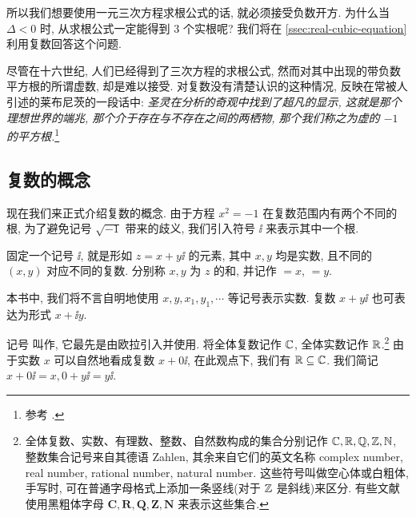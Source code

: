 所以我们想要使用一元三次方程求根公式的话, 就\alert{必须接受负数开方}.
为什么当 $\Delta<0$ 时, 从求根公式一定能得到 $3$ 个实根呢?
我们将在 \ref{ssec:real-cubic-equation}利用复数回答这个问题.

尽管在十六世纪, 人们已经得到了三次方程的求根公式, 然而对其中出现的带负数平方根的所谓虚数, 却是难以接受.
对复数没有清楚认识的这种情况, 反映在常被人引述的莱布尼茨的一段话中: \textcolor{third}{\itshape 圣灵在分析的奇观中找到了超凡的显示, 这就是那个理想世界的端兆, 那个介于存在与不存在之间的两栖物, 那个我们称之为虚的 $-1$ 的平方根.}\footnote{%
  参考 \cite[第13章2节]{Kline1990}.
}


\subsection{复数的概念}

现在我们来正式介绍复数的概念.
由于方程 $x^2=-1$ 在复数范围内有两个不同的根, 为了避免记号 $\sqrt{-1}$ 带来的歧义, 我们引入符号 $\ii$ 来表示其中一个根.

\begin{definition}
  固定一个记号 $\ii$, 就是形如 $z=x+y\ii$ 的元素, 其中 $x,y$ 均是实数, 且不同的 $(x,y)$ 对应不同的复数.
  分别称 $x,y$ 为 $z$ 的和, 并记作 ${}=x$, ${}=y$.
\end{definition}

本书中, 我们将不言自明地使用 $x,y,x_1,y_1,\cdots$ 等记号表示实数.
复数 $x+y\ii$ 也可表达为形式 $x+\ii y$.

记号 \noun{$\ii$} 叫作, 它最先是由欧拉引入并使用.
将\alert{全体复数记作 ${\mathbb{C}}$}, 全体实数记作 ${\mathbb{R}}$.\footnote{%
  全体复数、实数、有理数、整数、自然数构成的集合分别记作 ${\mathbb{C}},{\mathbb{R}},{\mathbb{Q}},{\mathbb{Z}},{\mathbb{N}}$, 整数集合记号来自其德语 Zahlen, 其余来自它们的英文名称 complex number, real number, rational number, natural number.
  这些符号叫做空心体或白粗体, 手写时, 可在普通字母格式上添加一条竖线(对于 ${\mathbb{Z}}$ 是斜线)来区分.
  有些文献使用黑粗体字母 $\mathbf{C,R,Q,Z,N}$ 来表示这些集合.
}
由于实数 $x$ 可以自然地看成复数 $x+0\ii$, 在此观点下, 我们有 ${\mathbb{R}}\subseteq {\mathbb{C}}$.
我们简记 $x+0\ii=x,0+y\ii=y\ii$.


